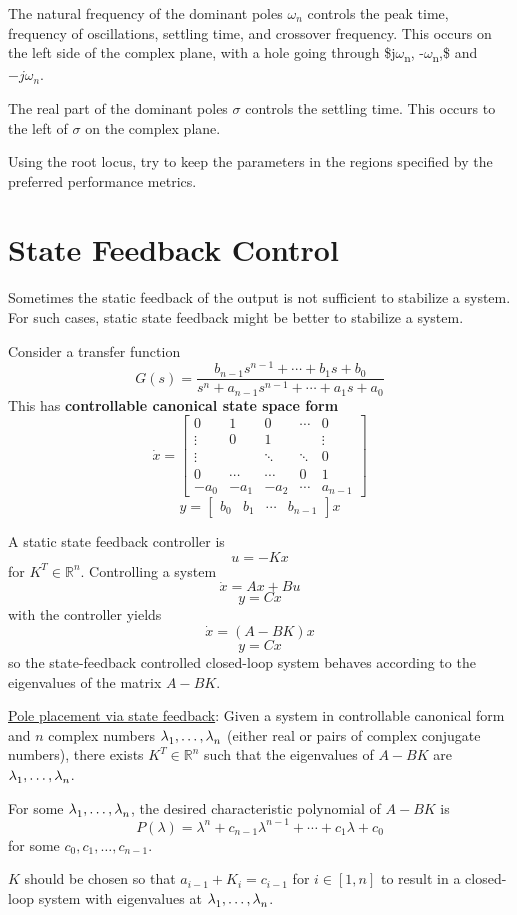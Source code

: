 \documentclass[11pt]{article}
\begin{document}
The natural frequency of the dominant poles \(\omega_{n}\) controls the peak time, frequency of
oscillations, settling time, and crossover frequency.
This occurs on the left side of the complex plane, with a hole going through \$j\(\omega\)\textsubscript{n}, -\(\omega\)\textsubscript{n},\$
and \(-j\omega_{n}\).

The real part of the dominant poles \(\sigma\) controls the settling time.
This occurs to the left of \(\sigma\) on the complex plane.

Using the root locus, try to keep the parameters in the regions specified by the preferred
performance metrics.
\section{State Feedback Control}
\label{sec:orgb801b8d}
Sometimes the static feedback of the output is not sufficient to stabilize a system.
For such cases, static state feedback might be better to stabilize a system.

Consider a transfer function
$$ G(s) = \frac{b_{n-1}s^{n-1} + \cdots + b_{1}s + b_{0}}{s^{n} + a_{n-1}s^{n-1} + \cdots + a_{1} s + a_{0}} $$
This has \textbf{controllable canonical state space form}
$$ \dot{x} = \begin{bmatrix} 0 & 1 & 0 & \cdots & 0 \\ \vdots & 0 & 1 & & \vdots \\ \vdots & & \ddots & \ddots & 0 \\ 0 & \cdots & \cdots & 0 & 1 \\ -a_{0} & -a_{1} & -a_{2} & \cdots & a_{n-1} \end{bmatrix} $$
$$ y = \begin{bmatrix} b_{0} & b_{1} & \cdots & b_{n-1} \end{bmatrix} x $$

A static state feedback controller is
$$ u = -Kx $$
for \(K^{T} \in \mathbb{R}^{n}\).
Controlling a system
$$ \dot{x} = Ax + Bu $$
$$y = Cx $$
with the controller yields
$$ \dot{x} = (A - BK) x $$
$$y = Cx $$
so the state-feedback controlled closed-loop system behaves according to the eigenvalues of
the matrix \(A - BK\).

\uline{Pole placement via state feedback}: Given a system in controllable canonical form and \(n\) complex
numbers \(\lambda^{\*}_{1}, \dots, \lambda^{\*}_{n}\) (either real or pairs of complex conjugate
numbers), there exists \(K^{T} \in \mathbb{R}^{n}\) such that the eigenvalues of \(A - BK\) are
\(\lambda^{\*}_{1}, \dots, \lambda_{n}^{\*}\).

For some \(\lambda_{1}^{\*}, \dots, \lambda_{n}^{\*}\), the desired characteristic polynomial of \(A-BK\) is
$$ P(\lambda) = \lambda^{n} + c_{n-1} \lambda^{n-1} + \cdots + c_{1} \lambda + c_{0} $$
for some \(c_{0}, c_{1} ,\dots, c_{n-1}\).

\(K\) should be chosen so that \(a_{i-1} + K_{i} = c_{i-1}\) for \(i \in [1, n]\)
to result in a closed-loop system with eigenvalues at \(\lambda_{1}^{\*}, \dots, \lambda_{n}^{\*}\).
\end{document}
